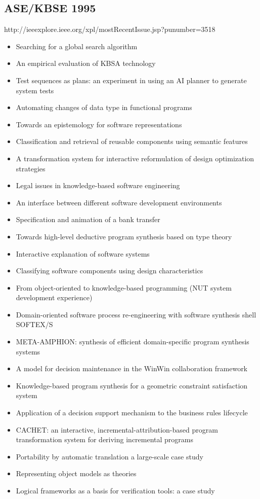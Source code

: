 \subsection{ASE/KBSE 1995}

http://ieeexplore.ieee.org/xpl/mostRecentIssue.jsp?punumber=3518

{\small
\begin{itemize}[itemsep=-1ex]
  \item Searching for a global search algorithm
  \item An empirical evaluation of KBSA technology
  \item Test sequences as plans: an experiment in using an AI planner to generate system tests
  \item Automating changes of data type in functional programs
  \item Towards an epistemology for software representations
  \item Classification and retrieval of reusable components using semantic features
  \item A transformation system for interactive reformulation of design optimization strategies
  \item Legal issues in knowledge-based software engineering
  \item An interface between different software development environments
  \item Specification and animation of a bank transfer
  \item Towards high-level deductive program synthesis based on type theory
  \item Interactive explanation of software systems
  \item Classifying software components using design characteristics
  \item From object-oriented to knowledge-based programming (NUT system development experience)
  \item Domain-oriented software process re-engineering with software synthesis shell SOFTEX/S
  \item META-AMPHION: synthesis of efficient domain-specific program synthesis systems
  \item A model for decision maintenance in the WinWin collaboration framework
  \item Knowledge-based program synthesis for a geometric constraint satisfaction system
  \item Application of a decision support mechanism to the business rules lifecycle
  \item CACHET: an interactive, incremental-attribution-based program transformation system for deriving incremental programs
  \item Portability by automatic translation a large-scale case study
  \item Representing object models as theories
  \item Logical frameworks as a basis for verification tools: a case study 
\end{itemize}
}

